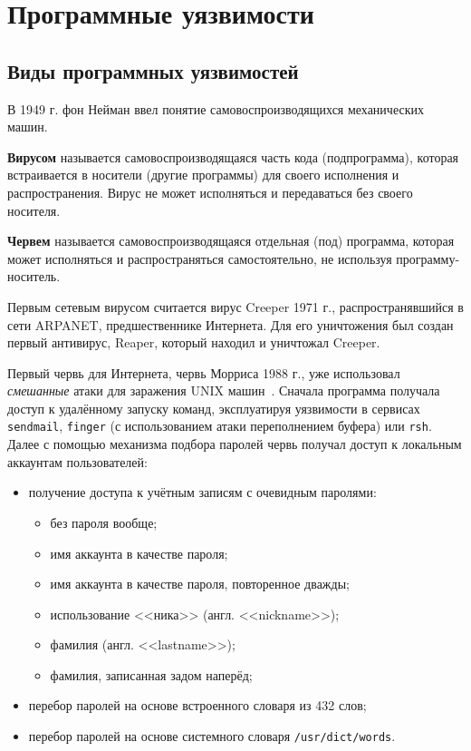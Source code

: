 \documentclass[10pt,a4paper]{book}
\begin{document}




\chapter{Программные уязвимости}





\section{Виды программных уязвимостей}

В 1949 г. фон Нейман ввел понятие самовоспроизводящихся механических машин.

\textbf{Вирусом} называется самовоспроизводящаяся часть кода (подпрограмма), которая встраивается в носители (другие программы) для своего исполнения и распространения. Вирус не может исполняться и передаваться без своего носителя.

\textbf{Червем} называется самовоспроизводящаяся отдельная (под) программа, которая может исполняться и распространяться самостоятельно, не используя программу-носитель.

Первым сетевым вирусом считается вирус Creeper 1971 г., распространявшийся в сети ARPANET, предшественнике Интернета. Для его уничтожения был создан первый антивирус, Reaper, который находил и уничтожал Creeper.

Первый червь для Интернета, червь Морриса 1988 г., уже использовал \emph{смешанные} атаки для заражения UNIX машин~\cite{EichinRochlis:1988}\cite{Spafford:1989}. Сначала программа получала доступ к удалённому запуску команд, эксплуатируя уязвимости в сервисах \texttt{sendmail}, \texttt{finger} (с использованием атаки переполнением буфера) или \texttt{rsh}. Далее с помощью механизма подбора паролей червь получал доступ к локальным аккаунтам пользователей:
\begin{itemize}
    \item получение доступа к учётным записям с очевидным паролями:
		\begin{itemize}
			\item без пароля вообще;
			\item имя аккаунта в качестве пароля;
			\item имя аккаунта в качестве пароля, повторенное дважды;
			\item использование <<ника>> (англ. <<nickname>>);
			\item фамилия (англ. <<lastname>>);
			\item фамилия, записанная задом наперёд;
		\end{itemize}
		\item перебор паролей на основе встроенного словаря из 432 слов;
		\item перебор паролей на основе системного словаря \texttt{/usr/dict/words}.
\end{itemize}
\end{document}
